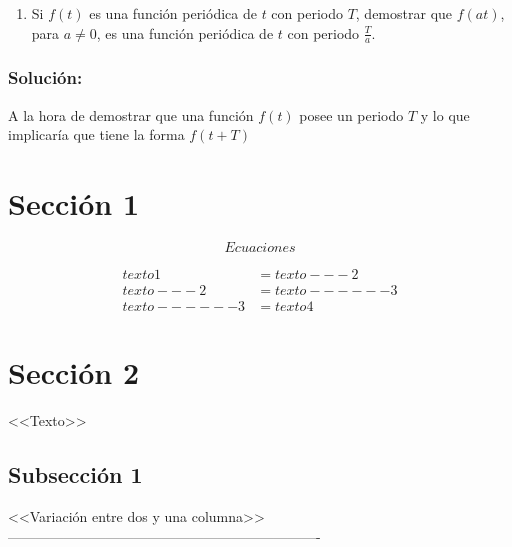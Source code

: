 \begin{multicols}{2}
\begin{enumerate}[resume]
    \item Si $f(t)$ es una función  periódica de $t$ con periodo $T$, demostrar que $f(at)$, para $a \neq 0 $, es una función periódica de $t$ con periodo $\frac{T}{a}$.
\end{enumerate}

\subsubsection*{\textbf{Solución:}}

A la hora de demostrar que una función $f(t)$ posee un periodo $T$ y lo que implicaría que tiene la forma $f(t+T)$

\section{Sección 1} 

\begin{equation}
    Ecuaciones
\label{ecuacion}
\end{equation}

\begin{equation*} %
\begin{split}
    texto1 & = texto---2 \\
    texto---2 & = texto------3 \\
    texto------3 & = texto4
\end{split}
\end{equation*}

\section{Sección 2}

<<Texto>>

\end{multicols}

\subsection{Subsección 1}

<<Variación entre dos y una columna>> -------------------------------------------------------------------

